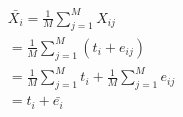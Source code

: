 \begin{align*}
	 & \bar{X_i}  =  \frac{1}{M}\sum_{j=1}^M X_{ij}                    \\
	 & =  \frac{1}{M}\sum_{j=1}^M (t_i + e_{ij})                       \\
	 & =  \frac{1}{M}\sum_{j=1}^M t_i + \frac{1}{M}\sum_{j=1}^M e_{ij} \\
	 & =  t_i + \bar{e_{i}}                                            \\
\end{align*}
